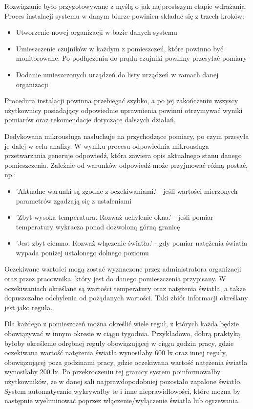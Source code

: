 Rozwiązanie było przygotowywane z myślą o jak najprostszym etapie wdrażania. Proces
instalacji systemu w danym biurze powinien składać się z trzech kroków:

\begin{itemize}
    \item Utworzenie nowej organizacji w bazie danych systemu
    \item Umieszczenie czujników w każdym z pomieszczeń, które powinno być monitorowane.
    Po podłączeniu do prądu czujniki powinny przesyłać pomiary
    \item Dodanie umieszczonych urządzeń do listy urządzeń w ramach danej organizacji
\end{itemize}

Procedura instalacji powinna przebiegać szybko, a po jej zakończeniu wszyscy użytkownicy
posiadający odpowiednie uprawnienia powinni otrzymywać wyniki pomiarów oraz rekomendacje
dotyczące dalszych działań.

Dedykowana mikrousługa nasłuchuje na przychodzące pomiary, po czym przesyła
je dalej w celu analizy. W wyniku procesu odpowiednia mikrousługa przetwarzania 
generuje odpowiedź, która zawiera opis aktualnego stanu danego pomieszczenia. Zależnie
od warunków odpowiedź może przyjmować różną postać, np.:

\begin{itemize}
    \item 'Aktualne warunki są zgodne z oczekiwaniami.' - jeśli wartości mierzonych 
    parametrów zgadzają się z ustaleniami
    \item 'Zbyt wysoka temperatura. Rozważ uchylenie okna.' - jeśli pomiar temperatury
    wykracza ponad dozwoloną górną granicę
    \item 'Jest zbyt ciemno. Rozważ włączenie światła.' - gdy pomiar natężenia światła
    wypada poniżej ustalonego dolnego poziomu
\end{itemize}

Oczekiwane wartości mogą zostać wyznaczone przez administratora organizacji oraz przez 
pracownika, który jest do danego pomieszczenia przypisany. W oczekiwaniach określane
są wartości temperatury oraz natężenia światła, a także dopuszczalne odchylenia od
pożądanych wartości. Taki zbiór informacji określany jest jako reguła.

Dla każdego z pomieszczeń można określić wiele reguł, z których każda będzie obowiązywać
w innym okresie w ciągu tygodnia. Przykładowo, dobrą praktyką byłoby określenie
odrębnej reguły obowiązującej w ciągu godzin pracy, gdzie oczekiwana wartość natężenia
światła wynosiłaby 600 lx oraz innej reguły, obowiązującej
poza godzinami pracy, gdzie oczekiwana wartość natężenia światła wynosiłaby 200 lx.
Po przekroczeniu tej granicy system poinformowałby użytkowników, że w danej sali
najprawdopodobniej pozostało zapalone światło. System automatycznie wykrywałby te i inne
nieprawidłowości, które można by następnie wyeliminować poprzez włączenie/wyłączenie światła
lub ogrzewania.

